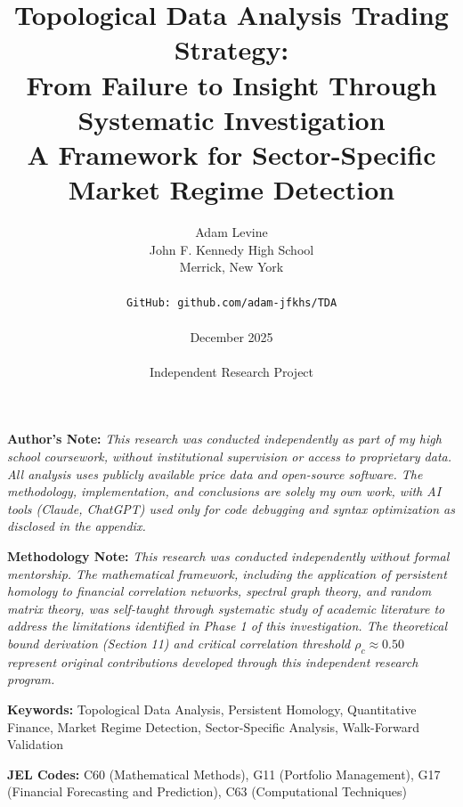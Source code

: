 \documentclass[12pt,letterpaper]{article}
\title{
\textbf{Topological Data Analysis Trading Strategy:\\
From Failure to Insight Through Systematic Investigation}\\
\vspace{0.3cm}
\large A Framework for Sector-Specific Market Regime Detection
}
\author{
Adam Levine\\
John F. Kennedy High School\\
Merrick, New York\\
\\
\texttt{GitHub: github.com/adam-jfkhs/TDA}\\
\\
December 2025\\
\\
Independent Research Project
}
\date{}
\begin{document}

\maketitle
\thispagestyle{empty}

\vspace{0.5in}

\noindent\textbf{Author's Note:} \textit{This research was conducted independently as part of my high school coursework, without institutional supervision or access to proprietary data. All analysis uses publicly available price data and open-source software. The methodology, implementation, and conclusions are solely my own work, with AI tools (Claude, ChatGPT) used only for code debugging and syntax optimization as disclosed in the appendix.}

\vspace{0.15in}

\noindent\textbf{Methodology Note:} \textit{This research was conducted independently without formal mentorship. The mathematical framework, including the application of persistent homology to financial correlation networks, spectral graph theory, and random matrix theory, was self-taught through systematic study of academic literature to address the limitations identified in Phase 1 of this investigation. The theoretical bound derivation (Section 11) and critical correlation threshold $\rho_c \approx 0.50$ represent original contributions developed through this independent research program.}

\vspace{0.25in}

\noindent\textbf{Keywords:} Topological Data Analysis, Persistent Homology, Quantitative Finance, Market Regime Detection, Sector-Specific Analysis, Walk-Forward Validation

\vspace{0.1in}

\noindent\textbf{JEL Codes:} C60 (Mathematical Methods), G11 (Portfolio Management), G17 (Financial Forecasting and Prediction), C63 (Computational Techniques)

\clearpage

\end{document}
